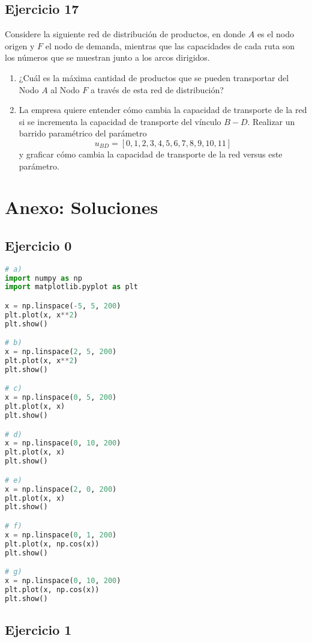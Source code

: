 \documentclass[12pt]{article}
\begin{document}
\subsection*{Ejercicio 17}

Considere la siguiente red de distribución de productos, en donde \(A\) es el nodo origen y \(F\) el nodo de demanda, mientras que las capacidades de cada ruta son los números que se muestran junto a los arcos dirigidos.

\begin{enumerate}
\item ¿Cuál es la máxima cantidad de productos que se pueden transportar del Nodo \(A\) al Nodo \(F\) a través de esta red de distribución?
\item La empresa quiere entender cómo cambia la capacidad de transporte de la red si se incrementa la capacidad de transporte del vínculo \(B-D\). Realizar un barrido paramétrico del parámetro 
\[
u_{BD} = [0,1,2,3,4,5,6,7,8,9,10,11]
\]
y graficar cómo cambia la capacidad de transporte de la red versus este parámetro.
\end{enumerate}

\newpage

\section{Anexo: Soluciones}

\subsection*{Ejercicio 0}
\begin{lstlisting}[language=Python]
# a)
import numpy as np
import matplotlib.pyplot as plt

x = np.linspace(-5, 5, 200)
plt.plot(x, x**2)
plt.show()

# b)
x = np.linspace(2, 5, 200)
plt.plot(x, x**2)
plt.show()

# c)
x = np.linspace(0, 5, 200)
plt.plot(x, x)
plt.show()

# d)
x = np.linspace(0, 10, 200)
plt.plot(x, x)
plt.show()

# e)
x = np.linspace(2, 0, 200)
plt.plot(x, x)
plt.show()

# f)
x = np.linspace(0, 1, 200)
plt.plot(x, np.cos(x))
plt.show()

# g)
x = np.linspace(0, 10, 200)
plt.plot(x, np.cos(x))
plt.show()
\end{lstlisting}

\subsection*{Ejercicio 1}
\end{document}
